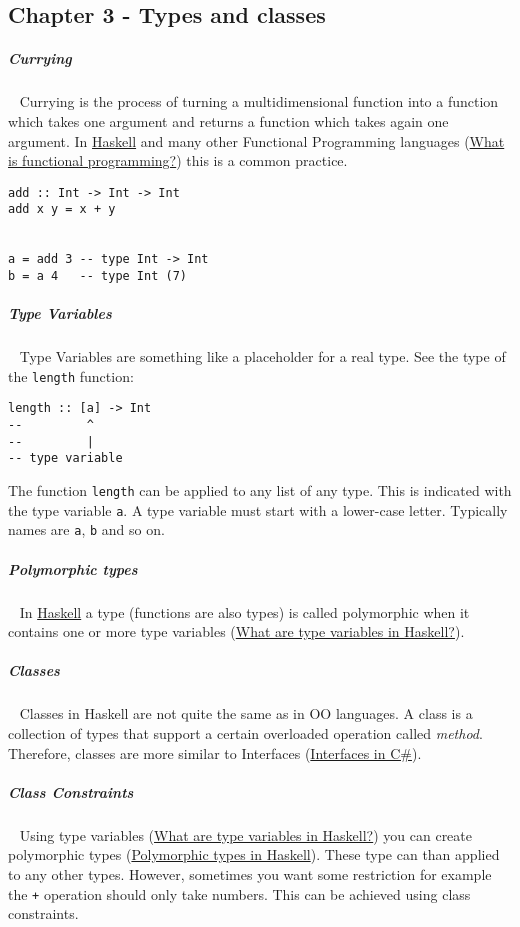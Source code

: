 \documentclass[11pt,twoside,landscape]{article}
\begin{document}
\begin{multicols}{3}
\section{Chapter 3 - Types and classes}
\label{sec:orgdd8c41b}
\subparagraph{Currying} \
\label{sec:orgbf10cb7}
Currying is the process of turning a multidimensional function into a function which takes one argument and returns a function which takes again one argument.
In \href{../../../roam/20210618182407-haskell.org}{Haskell} and many other Functional Programming languages (\href{../../../roam/20220126170637-what_is_functional_programming.org}{What is functional programming?}) this is a common practice.

\lstset{language=haskell,label= ,caption= ,captionpos=b,numbers=none}
\begin{lstlisting}
add :: Int -> Int -> Int
add x y = x + y


a = add 3 -- type Int -> Int
b = a 4   -- type Int (7)
\end{lstlisting}

\subparagraph{Type Variables} \
\label{sec:orga53b2e0}
Type Variables are something like a placeholder for a real type.
See the type of the \texttt{length} function:

\lstset{language=haskell,label= ,caption= ,captionpos=b,numbers=none}
\begin{lstlisting}
length :: [a] -> Int
--         ^
--         |
-- type variable
\end{lstlisting}

The function \texttt{length} can be applied to any list of any type.
This is indicated with the type variable \texttt{a}.
A type variable must start with a lower-case letter.
Typically names are \texttt{a}, \texttt{b} and so on.
\subparagraph{Polymorphic types} \
\label{sec:orgda739f5}
In \href{../../../roam/20210618182407-haskell.org}{Haskell} a type (functions are also types) is called polymorphic when it contains one or more type variables (\href{../../../roam/20220217094938-what_are_type_variables_in_haskell.org}{What are type variables in Haskell?}).
\subparagraph{Classes} \
\label{sec:org55ac3c5}
Classes in Haskell are not quite the same as in OO languages.
A class is a collection of types that support a certain overloaded operation called \emph{method}.
Therefore, classes are more similar to Interfaces (\href{../../../roam/20211029131058-interfaces_in_c.org}{Interfaces in C\#}).

\subparagraph{Class Constraints} \
\label{sec:org588c210}
Using type variables (\href{../../../roam/20220217094938-what_are_type_variables_in_haskell.org}{What are type variables in Haskell?}) you can create polymorphic types (\href{../../../roam/20220217095201-polymorphic_types_in_haskell.org}{Polymorphic types in Haskell}).
These type can than applied to any other types.
However, sometimes you want some restriction for example the \texttt{+} operation should only take numbers.
This can be achieved using class constraints.


\end{multicols}
\end{document}
